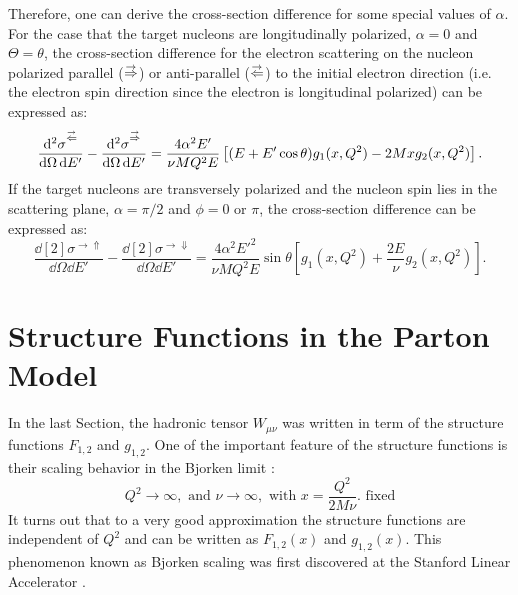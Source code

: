 Therefore, one can derive the cross-section difference for some special values of $\alpha$. For the case that the target nucleons are longitudinally polarized, $\alpha=0$ and $\Theta=\theta$, the cross-section difference for the electron scattering on the nucleon polarized parallel ($\buildrel\rightarrow\over\Rightarrow$) or anti-parallel ($\buildrel\rightarrow\over\Leftarrow$) to the initial electron direction (i.e. the electron spin direction since the electron is longitudinal polarized) can be expressed as:
\begin{equation} \label{C2S2E25}
\frac{\dd[2]{\sigma}^{\buildrel\rightarrow\over\Leftarrow}}{\dd{\Omega}\dd{E'}}-\frac{\dd[2]{\sigma}^{\buildrel\rightarrow\over\Rightarrow}}{\dd{\Omega}\dd{E'}}=\frac{4\alpha^2E'}{\nu MQ^2E}\left[(E+E'\cos\theta)g_1(x,Q^2)-2Mxg_2(x,Q^2)\right].
\end{equation}
If the target nucleons are transversely polarized and the nucleon spin lies in the scattering plane, $\alpha=\pi/2$ and $\phi=0$ or $\pi$, the cross-section difference can be expressed as:
\begin{equation} \label{C2S2E26}
\frac{\dd[2]{\sigma}^{\rightarrow\Uparrow}}{\dd{\Omega}\dd{E'}}-\frac{\dd[2]{\sigma}^{\rightarrow\Downarrow}}{\dd{\Omega}\dd{E'}}=\frac{4\alpha^2E'^2}{\nu MQ^2E}\sin\theta\left[g_1(x,Q^2)+\frac{2E}{\nu}g_2(x,Q^2)\right].
\end{equation}

\section{Structure Functions in the Parton Model}
\label{C2S3}

In the last Section, the hadronic tensor $W_{\mu\nu}$ was written in term of the structure functions $F_{1,2}$ and $g_{1,2}$. One of the important feature of the structure functions is their scaling behavior in the Bjorken limit \cite{Bjorken1969}:
\begin{equation} \label{C2S3E1}
Q^2\to\infty, \text{ and } \nu\to\infty, \text{ with } x=\frac{Q^2}{2M\nu}. \text{ fixed}
\end{equation}
It turns out that to a very good approximation the structure functions are independent of $Q^2$ and can be written as $F_{1,2}(x)$ and $g_{1,2}(x)$. This phenomenon known as Bjorken scaling was first discovered at the Stanford Linear Accelerator \cite{Kendall1991}.

